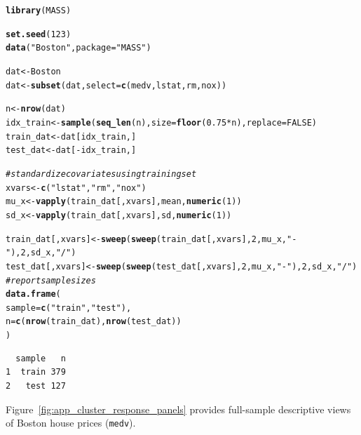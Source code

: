 \documentclass[article]{jss}\usepackage[]{graphicx}\usepackage[]{xcolor}
\makeatletter
\newcommand{\hlnum}[1]{\textcolor[rgb]{0.686,0.059,0.569}{#1}}%
\newcommand{\hlsng}[1]{\textcolor[rgb]{0.192,0.494,0.8}{#1}}%
\newcommand{\hlcom}[1]{\textcolor[rgb]{0.678,0.584,0.686}{\textit{#1}}}%
\newcommand{\hlopt}[1]{\textcolor[rgb]{0,0,0}{#1}}%
\newcommand{\hldef}[1]{\textcolor[rgb]{0.345,0.345,0.345}{#1}}%
\newcommand{\hlkwb}[1]{\textcolor[rgb]{0.69,0.353,0.396}{#1}}%
\newcommand{\hlkwc}[1]{\textcolor[rgb]{0.333,0.667,0.333}{#1}}%
\newcommand{\hlkwd}[1]{\textcolor[rgb]{0.737,0.353,0.396}{\textbf{#1}}}%
\newenvironment{kframe}{%
 \def\at@end@of@kframe{}%
 \ifinner\ifhmode%
  \def\at@end@of@kframe{\end{minipage}}%
  \begin{minipage}{\columnwidth}%
 \fi\fi%
 \def\FrameCommand##1{\hskip\@totalleftmargin \hskip-\fboxsep
 \colorbox{shadecolor}{##1}\hskip-\fboxsep
     \hskip-\linewidth \hskip-\@totalleftmargin \hskip\columnwidth}%
 \MakeFramed {\advance\hsize-\width
   \@totalleftmargin\z@ \linewidth\hsize
   \@setminipage}}%
 {\par\unskip\endMakeFramed%
 \at@end@of@kframe}
\newenvironment{knitrout}{}{} %
\DeclareRobustCommand{\code}[1]{\nolinkurl{#1}}
\makeatother
\begin{document}
\begin{knitrout}\footnotesize
{}\color{fgcolor}\begin{kframe}
\begin{alltt}
\hlkwd{library}\hldef{(MASS)}

\hlkwd{set.seed}\hldef{(}\hlnum{123}\hldef{)}
\hlkwd{data}\hldef{(}\hlsng{"Boston"}\hldef{,} \hlkwc{package} \hldef{=} \hlsng{"MASS"}\hldef{)}

\hldef{dat} \hlkwb{<-} \hldef{Boston}
\hldef{dat} \hlkwb{<-} \hlkwd{subset}\hldef{(dat,} \hlkwc{select} \hldef{=} \hlkwd{c}\hldef{(medv, lstat, rm, nox))}

\hldef{n} \hlkwb{<-} \hlkwd{nrow}\hldef{(dat)}
\hldef{idx_train} \hlkwb{<-} \hlkwd{sample}\hldef{(}\hlkwd{seq_len}\hldef{(n),} \hlkwc{size} \hldef{=} \hlkwd{floor}\hldef{(}\hlnum{0.75} \hlopt{*} \hldef{n),} \hlkwc{replace} \hldef{=} \hlnum{FALSE}\hldef{)}
\hldef{train_dat} \hlkwb{<-} \hldef{dat[idx_train, ]}
\hldef{test_dat}  \hlkwb{<-} \hldef{dat[}\hlopt{-}\hldef{idx_train, ]}

\hlcom{# standardize covariates using training set}
\hldef{xvars} \hlkwb{<-} \hlkwd{c}\hldef{(}\hlsng{"lstat"}\hldef{,} \hlsng{"rm"}\hldef{,} \hlsng{"nox"}\hldef{)}
\hldef{mu_x}  \hlkwb{<-} \hlkwd{vapply}\hldef{(train_dat[, xvars], mean,} \hlkwd{numeric}\hldef{(}\hlnum{1}\hldef{))}
\hldef{sd_x}  \hlkwb{<-} \hlkwd{vapply}\hldef{(train_dat[, xvars], sd,}   \hlkwd{numeric}\hldef{(}\hlnum{1}\hldef{))}

\hldef{train_dat[, xvars]} \hlkwb{<-} \hlkwd{sweep}\hldef{(}\hlkwd{sweep}\hldef{(train_dat[, xvars],} \hlnum{2}\hldef{, mu_x,} \hlsng{"-"}\hldef{),} \hlnum{2}\hldef{, sd_x,} \hlsng{"/"}\hldef{)}
\hldef{test_dat[, xvars]}  \hlkwb{<-} \hlkwd{sweep}\hldef{(}\hlkwd{sweep}\hldef{(test_dat[, xvars],}  \hlnum{2}\hldef{, mu_x,} \hlsng{"-"}\hldef{),} \hlnum{2}\hldef{, sd_x,} \hlsng{"/"}\hldef{)}
\hlcom{# report sample sizes}
\hlkwd{data.frame}\hldef{(}
  \hlkwc{sample} \hldef{=} \hlkwd{c}\hldef{(}\hlsng{"train"}\hldef{,} \hlsng{"test"}\hldef{),}
  \hlkwc{n} \hldef{=} \hlkwd{c}\hldef{(}\hlkwd{nrow}\hldef{(train_dat),} \hlkwd{nrow}\hldef{(test_dat))}
\hldef{)}
\end{alltt}
\begin{verbatim}
  sample   n
1  train 379
2   test 127
\end{verbatim}
\end{kframe}
\end{knitrout}

Figure~\ref{fig:app_cluster_response_panels} provides full-sample
descriptive views of Boston house prices (\code{medv}).
\end{document}
